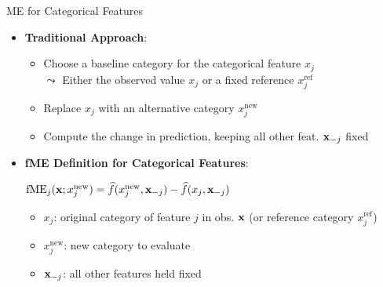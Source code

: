 \documentclass[10pt,compress,t,notes=noshow, xcolor=table]{beamer}
\begin{document}
\begin{frame}{ME for Categorical Features}
\begin{itemize}
\item \textbf{Traditional Approach}:
\begin{itemize}
  \item Choose a baseline category for the categorical feature \(x_j\) \\
  $\leadsto$ Either the observed value \(x_j\) or a fixed reference \(x_j^\text{ref}\)
  \item Replace \(x_j\) with an alternative category \(x_j^\text{new}\)
  \item Compute the change in prediction, keeping all other feat. \(\mathbf{x}_{-j}\) fixed
\end{itemize}

\item \textbf{fME Definition for Categorical Features}:\\
\medskip
\centerline{$
\text{fME}_j(\mathbf{x}; x_j^\text{new}) = \widehat{f}(x_j^\text{new}, \mathbf{x}_{-j}) - \widehat{f}(x_j, \mathbf{x}_{-j})$}
\medskip
\begin{itemize}
\item \(x_j\): original category of feature \(j\) in obs. \(\mathbf{x}\) (or reference category $x_j^\text{ref}$)
\item \(x_j^\text{new}\): new category to evaluate
\item \(\mathbf{x}_{-j}\): all other features held fixed
\end{itemize}


\end{itemize}
\end{frame}
\end{document}
